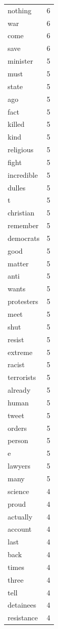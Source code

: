 \begin{tabular}{lr}
nothing & 6 \\
war & 6 \\
come & 6 \\
save & 6 \\
minister & 5 \\
must & 5 \\
state & 5 \\
ago & 5 \\
fact & 5 \\
killed & 5 \\
kind & 5 \\
religious & 5 \\
fight & 5 \\
incredible & 5 \\
dulles & 5 \\
t & 5 \\
christian & 5 \\
remember & 5 \\
democrats & 5 \\
good & 5 \\
matter & 5 \\
anti & 5 \\
wants & 5 \\
protesters & 5 \\
meet & 5 \\
shut & 5 \\
resist & 5 \\
extreme & 5 \\
racist & 5 \\
terrorists & 5 \\
already & 5 \\
human & 5 \\
tweet & 5 \\
orders & 5 \\
person & 5 \\
e & 5 \\
lawyers & 5 \\
many & 5 \\
science & 4 \\
proud & 4 \\
actually & 4 \\
account & 4 \\
last & 4 \\
back & 4 \\
times & 4 \\
three & 4 \\
tell & 4 \\
detainees & 4 \\
resistance & 4 \\

\end{tabular}
